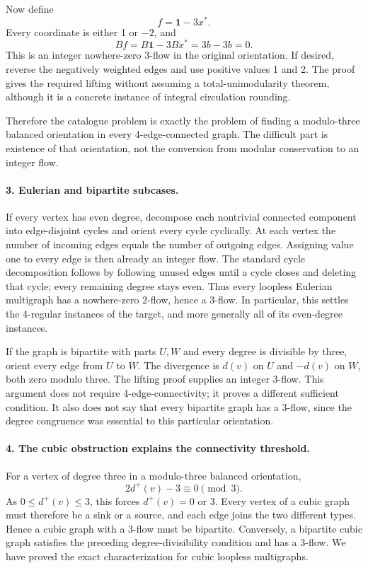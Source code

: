 \documentclass[11pt]{article}
\begin{document}
Now define
\[
 f=\mathbf1-3x^*.
\]
Every coordinate is either 1 or $-2$, and
\[
 Bf=B\mathbf1-3Bx^*=3b-3b=0.
\]
This is an integer nowhere-zero 3-flow in the original orientation. If desired, reverse the negatively weighted edges and use positive values 1 and 2. The proof gives the required lifting without assuming a total-unimodularity theorem, although it is a concrete instance of integral circulation rounding.

Therefore the catalogue problem is exactly the problem of finding a modulo-three balanced orientation in every 4-edge-connected graph. The difficult part is existence of that orientation, not the conversion from modular conservation to an integer flow.

\paragraph{3. Eulerian and bipartite subcases.}
If every vertex has even degree, decompose each nontrivial connected component into edge-disjoint cycles and orient every cycle cyclically. At each vertex the number of incoming edges equals the number of outgoing edges. Assigning value one to every edge is then already an integer flow. The standard cycle decomposition follows by following unused edges until a cycle closes and deleting that cycle; every remaining degree stays even. Thus every loopless Eulerian multigraph has a nowhere-zero 2-flow, hence a 3-flow. In particular, this settles the 4-regular instances of the target, and more generally all of its even-degree instances.

If the graph is bipartite with parts $U,W$ and every degree is divisible by three, orient every edge from $U$ to $W$. The divergence is $d(v)$ on $U$ and $-d(v)$ on $W$, both zero modulo three. The lifting proof supplies an integer 3-flow. This argument does not require 4-edge-connectivity; it proves a different sufficient condition. It also does not say that every bipartite graph has a 3-flow, since the degree congruence was essential to this particular orientation.

\paragraph{4. The cubic obstruction explains the connectivity threshold.}
For a vertex of degree three in a modulo-three balanced orientation,
\[
 2d^+(v)-3\equiv0\pmod3.
\]
As $0\le d^+(v)\le3$, this forces $d^+(v)=0$ or $3$. Every vertex of a cubic graph must therefore be a sink or a source, and each edge joins the two different types. Hence a cubic graph with a 3-flow must be bipartite. Conversely, a bipartite cubic graph satisfies the preceding degree-divisibility condition and has a 3-flow. We have proved the exact characterization for cubic loopless multigraphs.
\end{document}
